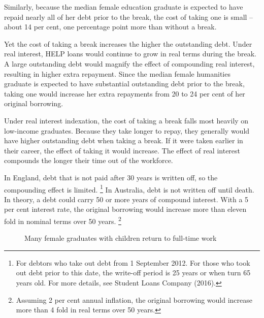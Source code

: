 \documentclass[embargoed]{grattan}
\begin{document}
{Similarly, because the median female education graduate is expected to have repaid nearly all of her debt prior to the break, the cost of taking one is small -- about 14 per cent, one percentage point more than without a break.

Yet the cost of taking a break increases the higher the outstanding debt.
Under real interest, \gls{HELP} loans would continue to grow in real terms during the break.
A large outstanding debt would magnify the effect of compounding real interest, resulting in higher extra repayment.
Since the median female humanities graduate is expected to have substantial outstanding debt prior to the break, taking one would increase her extra repayments from 20 to 24 per cent of her original borrowing.

Under real interest indexation, the cost of taking a break falls most heavily on low-income graduates.
Because they take longer to repay, they generally would have higher outstanding debt when taking a break.
If it were taken earlier in their career, the effect of taking it would increase.
The effect of real interest compounds the longer their time out of the workforce.

In England, debt that is not paid after 30 years is written off, so the compounding effect is limited.%
\footnote{For debtors who take out debt from 1 September 2012.
For those who took out debt prior to this date, the write-off period is 25 years or when turn 65 years old.
For more details, see Student Loans Company (2016).} In Australia, debt is not written off until death.
In theory, a debt could carry 50 or more years of compound interest.
With a 5 per cent interest rate, the original borrowing would increase more than eleven fold in nominal terms over 50 years.%
\footnote{Assuming 2 per cent annual inflation, the original borrowing would increase more than 4 fold in real terms over 50 years.}

\begin{figure}
\caption{Many female graduates with children return to full-time work}\label{fig:fig16-many-female-grads-with-children-return-to-full-time-work}



\end{figure}}
\end{document}

